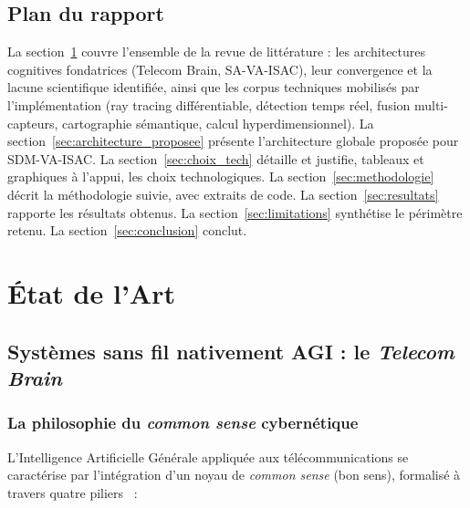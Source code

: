 \documentclass[12pt,a4paper,titlepage]{article}
\begin{document}
\subsection{Plan du rapport}

La section~\ref{sec:etat_art} couvre l'ensemble de la revue de littérature : les architectures cognitives fondatrices (Telecom Brain, SA-VA-ISAC), leur convergence et la lacune scientifique identifiée, ainsi que les corpus techniques mobilisés par l'implémentation (ray tracing différentiable, détection temps réel, fusion multi-capteurs, cartographie sémantique, calcul hyperdimensionnel). La section~\ref{sec:architecture_proposee} présente l'architecture globale proposée pour SDM-VA-ISAC. La section~\ref{sec:choix_tech} détaille et justifie, tableaux et graphiques à l'appui, les choix technologiques. La section~\ref{sec:methodologie} décrit la méthodologie suivie, avec extraits de code. La section~\ref{sec:resultats} rapporte les résultats obtenus. La section~\ref{sec:limitations} synthétise le périmètre retenu. La section~\ref{sec:conclusion} conclut.

\section{État de l'Art}
\label{sec:etat_art}

\subsection{Systèmes sans fil nativement AGI : le \textit{Telecom Brain}}
\label{subsec:telecom_brain}

\subsubsection{La philosophie du \textit{common sense} cybernétique}

L'Intelligence Artificielle Générale appliquée aux télécommunications se caractérise par l'intégration d'un noyau de \textit{common sense} (bon sens), formalisé à travers quatre piliers~\cite{saad2025} :
\end{document}

